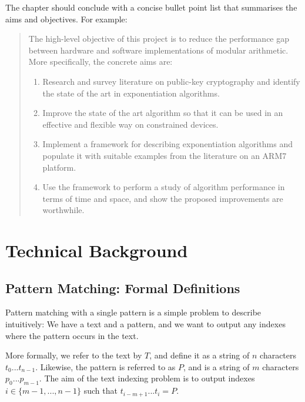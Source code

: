 \documentclass[ %
                    author={Dominic Joseph Moylett},
                    degree={MEng},
                     title={Dictionary Matching with Fingerprints},
                  subtitle={An Empirical Analysis},
                      type={Research},
                      year={2014} ]{dissertation}
\begin{document}
The chapter should conclude with a concise bullet point list that 
summarises the aims and objectives.  For example:

\begin{quote}
\noindent
The high-level objective of this project is to reduce the performance 
gap between hardware and software implementations of modular arithmetic.  
More specifically, the concrete aims are:

\begin{enumerate}
\item Research and survey literature on public-key cryptography and
      identify the state of the art in exponentiation algorithms.
\item Improve the state of the art algorithm so that it can be used
      in an effective and flexible way on constrained devices.
\item Implement a framework for describing exponentiation algorithms
      and populate it with suitable examples from the literature on 
      an ARM7 platform.
\item Use the framework to perform a study of algorithm performance
      in terms of time and space, and show the proposed improvements
      are worthwhile.
\end{enumerate}
\end{quote}


\chapter{Technical Background}
\label{chap:technical}

\section{Pattern Matching: Formal Definitions}

Pattern matching with a single pattern is a simple problem to describe intuitively: We have a text and a pattern, and we want to output any indexes where the pattern occurs in the text.

More formally, we refer to the text by $T$, and define it as a string of $n$ characters $t_0...t_{n-1}$. Likewise, the pattern is referred to as $P$, and is a string of $m$ characters $p_0...p_{m-1}$. The aim of the text indexing problem is to output indexes $i \in \{m-1,...,n-1\}$ such that $t_{i-m+1}...t_{i} = P$.
\end{document}
